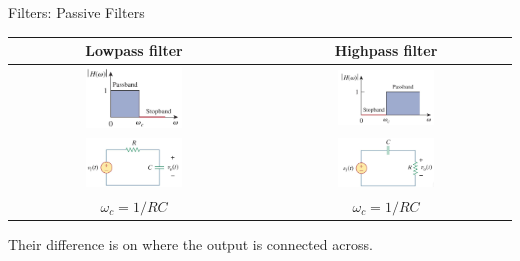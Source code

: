 \documentclass{beamer}
\begin{document}
\begin{frame}{Filters: Passive Filters}

\begin{table}[]
    \centering
    \begin{tabular}{cc}
        \toprule
        \textbf{Lowpass filter} & \textbf{Highpass filter}  \\
        \midrule
        \includegraphics[width=0.4\textwidth]{C14/lowpass_diagram.jpeg}
         &
         \includegraphics[width=0.4\textwidth]{C14/highpass_diagram.jpeg}
         \\
        \includegraphics[width=0.4\textwidth]{C14/lowpass.jpeg}
        & 
        \includegraphics[width=0.4\textwidth]{C14/highpass.jpeg}
        \\
        $\omega_c = 1/RC$ & $\omega_c = 1/RC$ \\
        \bottomrule
    \end{tabular}
\end{table}

Their difference is on where the output is connected across.
    
\end{frame}

\end{document}
